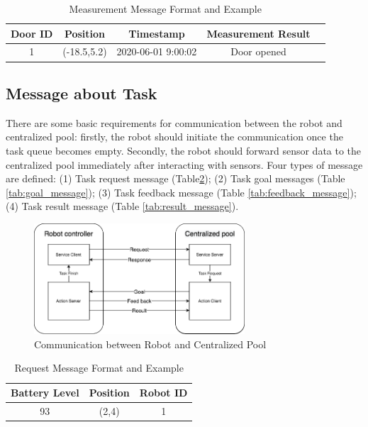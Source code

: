 \begin{table}
\centering
\begin{tabular}{|c|c|c|c|c|} 
\hline
Door ID & Position& Timestamp & Measurement Result \\
\hline\hline
1&(-18.5,5.2) & 2020-06-01 9:00:02 & Door opened \\ [1ex] 
\hline
\end{tabular}
\caption{Measurement Message Format and Example}
\label{tab:sensor_message}
\end{table}
 

\subsection{Message about Task}
\label{sec:task_message}
There are some basic requirements for communication between the robot and centralized pool: firstly, the robot should initiate the communication once the task queue becomes empty. 
Secondly, the robot should forward sensor data to the centralized pool immediately after interacting with sensors. 
Four types of message are defined: 
(1) Task request message (Table\ref{tab:request_message}); (2) Task goal messages (Table \ref{tab:goal_message}); (3) Task feedback message (Table \ref{tab:feedback_message}); (4) Task result message (Table \ref{tab:result_message}). 

\begin{figure}
 \centering
 \includegraphics[width = 0.7\textwidth]{content/images/ch4/robot_pool_comminication.drawio.png}
 \caption{Communication between Robot and Centralized Pool}
 \label{fig:communication_robot_pool}
\end{figure}

\begin{table}
\centering
\begin{tabular}{|c|c|c|} 
\hline
Battery Level & Position & Robot ID\\
\hline\hline
93 &(2,4) &1 \\ [1ex] 
\hline
\end{tabular}
\caption{Request Message Format and Example}
\label{tab:request_message}
\end{table}

